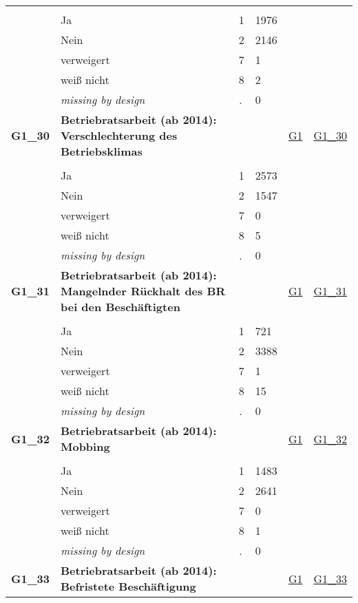 \begin{longtable}{| L{2.45cm} | L{6cm} | C{1.5cm} | R{1cm} | C{2.25cm} | C{2.25cm} |}
   &  &  &  &  &  \\ 
   & Ja & 1 & 1976 &  &  \\ 
   & Nein & 2 & 2146 &  &  \\ 
   & verweigert & 7 & 1 &  &  \\ 
   & weiß nicht & 8 & 2 &  &  \\ 
   & \textit{missing by design} & \textit{.} & 0 &  &  \\ 
   \midrule
\textbf{G1\_30}\label{var:G1:30} & \textbf{Betriebratsarbeit (ab 2014): Verschlechterung des Betriebsklimas} &  &  & \hyperref[G1]{G1} & \hyperref[var:suf:G1:30]{G1\_30} \\ 
   &  &  &  &  &  \\ 
   & Ja & 1 & 2573 &  &  \\ 
   & Nein & 2 & 1547 &  &  \\ 
   & verweigert & 7 & 0 &  &  \\ 
   & weiß nicht & 8 & 5 &  &  \\ 
   & \textit{missing by design} & \textit{.} & 0 &  &  \\ 
   \midrule
\textbf{G1\_31}\label{var:G1:31} & \textbf{Betriebratsarbeit (ab 2014): Mangelnder Rückhalt des BR bei den Beschäftigten} &  &  & \hyperref[G1]{G1} & \hyperref[var:suf:G1:31]{G1\_31} \\ 
   &  &  &  &  &  \\ 
   & Ja & 1 & 721 &  &  \\ 
   & Nein & 2 & 3388 &  &  \\ 
   & verweigert & 7 & 1 &  &  \\ 
   & weiß nicht & 8 & 15 &  &  \\ 
   & \textit{missing by design} & \textit{.} & 0 &  &  \\ 
   \midrule
\textbf{G1\_32}\label{var:G1:32} & \textbf{Betriebratsarbeit (ab 2014): Mobbing} &  &  & \hyperref[G1]{G1} & \hyperref[var:suf:G1:32]{G1\_32} \\ 
   &  &  &  &  &  \\ 
   & Ja & 1 & 1483 &  &  \\ 
   & Nein & 2 & 2641 &  &  \\ 
   & verweigert & 7 & 0 &  &  \\ 
   & weiß nicht & 8 & 1 &  &  \\ 
   & \textit{missing by design} & \textit{.} & 0 &  &  \\ 
   \midrule
\textbf{G1\_33}\label{var:G1:33} & \textbf{Betriebratsarbeit (ab 2014): Befristete Beschäftigung} &  &  & \hyperref[G1]{G1} & \hyperref[var:suf:G1:33]{G1\_33} \\ 

\end{longtable}
